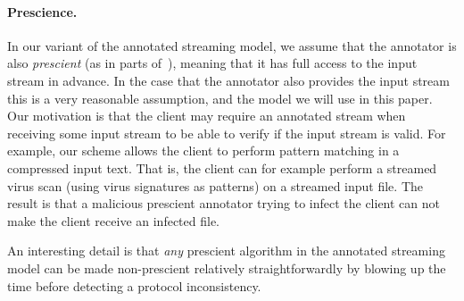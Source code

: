 \paragraph{Prescience.} 
In our variant of the annotated streaming model, we assume that the annotator is also \emph{prescient} (as in parts of~\cite{chakrabarti2009annotations, chakrabarti2014annotations}), meaning that it has full access to the input stream in advance. In the case that the annotator also provides the input stream this is a very reasonable assumption, and the model we will use in this paper.
Our motivation is that the client may require an annotated stream when receiving some input stream to be able to verify if the input stream is valid. For example, our scheme allows the client to perform pattern matching in a compressed input text. That is, the client can for example perform a streamed virus scan (using virus signatures as patterns) on a streamed input file. The result is that a malicious prescient annotator trying to infect the client can not make the client receive an infected file.

An interesting detail is that \emph{any} prescient algorithm in the annotated streaming model can be made non-prescient relatively straightforwardly by blowing up the time before detecting a protocol inconsistency.





